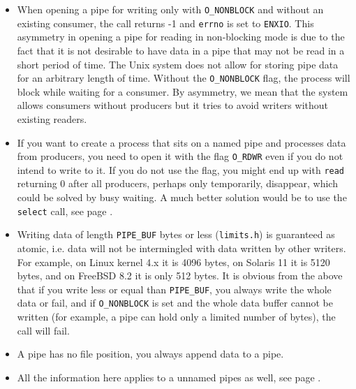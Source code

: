 \begin{itemize}
\item When opening a pipe for writing only with \texttt{O\_NONBLOCK} and without
an existing consumer, the call returns -1 and \texttt{errno} is set to
\texttt{ENXIO}.  This asymmetry in opening a pipe for reading in non-blocking
mode is due to the fact that it is not desirable to have data in a pipe that may
not be read in a short period of time.  The Unix system does not allow for
storing pipe data for an arbitrary length of time.  Without the
\texttt{O\_NONBLOCK} flag, the process will block while waiting for a consumer.
By asymmetry, we mean that the system allows consumers without
producers but it tries to avoid writers without existing readers.
\item  If you want to create a process that sits on a named pipe and processes
data from producers, you need to open it with the flag \texttt{O\_RDWR} even
if you do not intend to write to it.  If you do not use the flag, you might end
up with \texttt{read} returning 0 after all producers, perhaps only temporarily,
disappear, which could be solved by busy waiting.  A much better solution would
be to use the \texttt{select} call, see page \pageref{SELECT}.
\item Writing data of length \texttt{PIPE\_BUF} bytes or less
(\texttt{limits.h}) is guaranteed as atomic, i.e. data will not be intermingled
with data written by other writers.  For example, on Linux kernel 4.x it is 4096
bytes, on Solaris 11 it is 5120 bytes, and on FreeBSD 8.2 it is only 512 bytes.
It is obvious from the above that if you write less or equal than
\texttt{PIPE\_BUF}, you always write the whole data or fail, and if
\texttt{O\_NONBLOCK} is set and the whole data buffer cannot be written (for
example, a pipe can hold only a limited number of bytes), the call will fail.
\item A pipe has no file position, you always append data to a pipe.
\item All the information here applies to a unnamed pipes as well, see page
\pageref{PIPE}.


\end{itemize}
